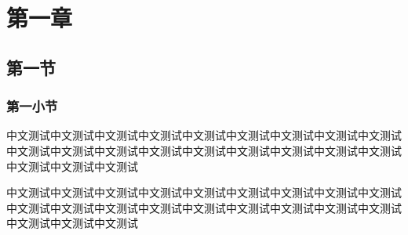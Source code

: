 \documentclass{ustb-thesis}
\begin{document}


\chapter{第一章}
\section{第一节}
\subsection{第一小节}
中文测试中文测试中文测试中文测试中文测试中文测试中文测试中文测试中文测试中文测试中文测试中文测试中文测试中文测试中文测试中文测试中文测试中文测试中文测试中文测试中文测试

中文测试中文测试中文测试中文测试中文测试中文测试中文测试中文测试中文测试中文测试中文测试中文测试中文测试中文测试中文测试中文测试中文测试中文测试中文测试中文测试中文测试
\end{document}
